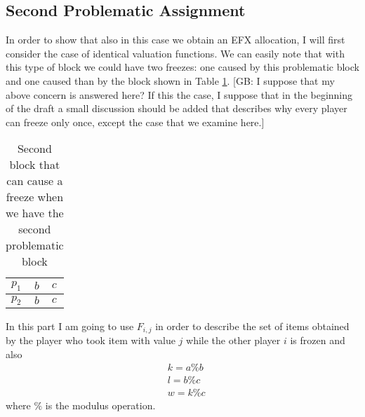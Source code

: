 \documentclass{article}
\newcommand{\gb}[1]{{\color{red}[GB: #1]}}
\begin{document}
\subsection{Second Problematic Assignment}
In order to show that also in this case we obtain an EFX allocation, I will first consider the case of identical valuation functions. We can easily note that with this type of block we could have two freezes: one caused by this problematic block and one caused than by the block shown in Table \ref{table:bbcc-block}.
\gb{I suppose that my above concern is answered here? If this the case, I suppose that in the beginning of the draft a small discussion should be added that describes why every player can freeze only once, except the case that we examine here.}
\begin{table}[h]
        \centering
        \begin{tabular}{|l|l|l|}
            \hline
            $p_1$ & $b$ & $c$ \\ \hline
            $p_2$ & $b$ & $c$ \\ \hline
        \end{tabular}
        
        \caption{Second block that can cause a freeze when we have the second problematic block}
        \label{table:bbcc-block}
    \end{table}
In this part I am going to use $F_{i,j}$ in order to describe the set of items obtained by the player who took item with value $j$ while the other player $i$ is frozen and also
\begin{align*}
    &k = a\% b\\
    &l = b \% c\\
    &w = k \% c
\end{align*}
where $\%$ is the modulus operation.
\end{document}
